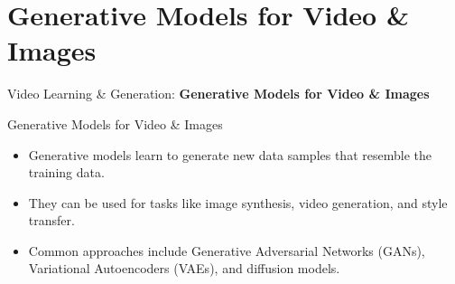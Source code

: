\section{Generative Models for Video \& Images}
\begin{frame}{}
    \LARGE Video Learning \& Generation: \textbf{Generative Models for Video \& Images}
\end{frame}

\begin{frame}{Generative Models for Video \& Images}
    \begin{itemize}
        \item Generative models learn to generate new data samples that resemble the training data.
        \item They can be used for tasks like image synthesis, video generation, and style transfer.
        \item Common approaches include Generative Adversarial Networks (GANs), Variational Autoencoders (VAEs), and diffusion models.
    \end{itemize}
\end{frame}







